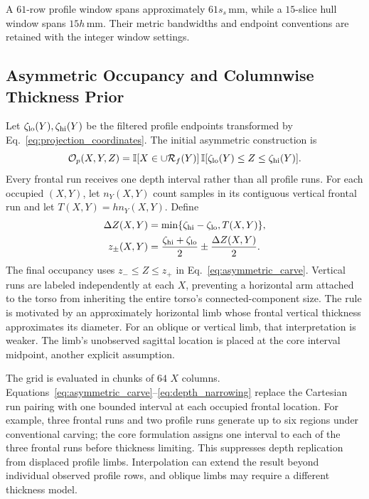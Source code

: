 \documentclass[11pt,a4paper]{article}
\numberwithin{equation}{section}
\begin{document}
A $61$-row profile window spans approximately $61s_s$\,mm, while a $15$-slice hull window spans $15h$\,mm. Their metric bandwidths and endpoint conventions are retained with the integer window settings.

\subsection{Asymmetric Occupancy and Columnwise Thickness Prior}
Let $\zeta_{\rm lo}(Y),\zeta_{\rm hi}(Y)$ be the filtered profile endpoints transformed by Eq.~\eqref{eq:projection_coordinates}. The initial asymmetric construction is
\begin{equation}
\mathcal O_p(X,Y,Z)=\mathbb I[X\in\cup\mathcal R_f(Y)]\,
\mathbb I[\zeta_{\rm lo}(Y)\le Z\le\zeta_{\rm hi}(Y)].
\label{eq:asymmetric_carve}
\end{equation}
Every frontal run receives one depth interval rather than all profile runs. For each occupied $(X,Y)$, let $n_Y(X,Y)$ count samples in its contiguous vertical frontal run and let $T(X,Y)=hn_Y(X,Y)$. Define
\begin{align}
\Delta Z(X,Y)&=\min\{\zeta_{\rm hi}-\zeta_{\rm lo},T(X,Y)\},\label{eq:depth_narrowing}\\
z_\pm(X,Y)&=\frac{\zeta_{\rm hi}+\zeta_{\rm lo}}{2}\pm\frac{\Delta Z(X,Y)}2.\nonumber
\end{align}
The final occupancy uses $z_-\le Z\le z_+$ in Eq.~\eqref{eq:asymmetric_carve}. Vertical runs are labeled independently at each $X$, preventing a horizontal arm attached to the torso from inheriting the entire torso's connected-component size. The rule is motivated by an approximately horizontal limb whose frontal vertical thickness approximates its diameter. For an oblique or vertical limb, that interpretation is weaker. The limb's unobserved sagittal location is placed at the core interval midpoint, another explicit assumption.

The grid is evaluated in chunks of $64$ $X$ columns. Equations~\eqref{eq:asymmetric_carve}--\eqref{eq:depth_narrowing} replace the Cartesian run pairing with one bounded interval at each occupied frontal location. For example, three frontal runs and two profile runs generate up to six regions under conventional carving; the core formulation assigns one interval to each of the three frontal runs before thickness limiting. This suppresses depth replication from displaced profile limbs. Interpolation can extend the result beyond individual observed profile rows, and oblique limbs may require a different thickness model.
\end{document}
